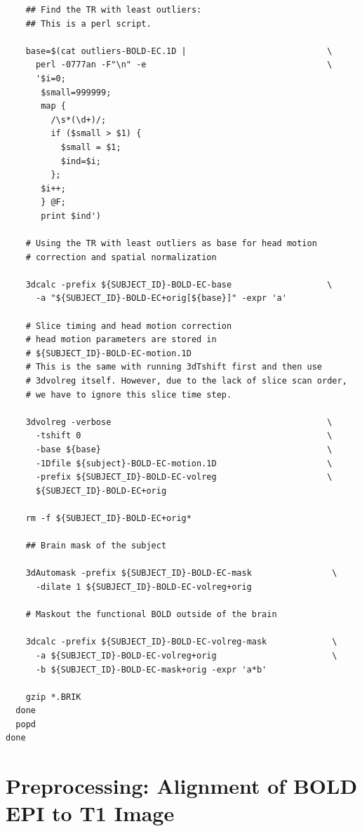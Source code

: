 \documentclass[12pt]{article}
\begin{document}
\begin{verbatim}
    ## Find the TR with least outliers:
    ## This is a perl script.

    base=$(cat outliers-BOLD-EC.1D |                            \
      perl -0777an -F"\n" -e                                    \
      '$i=0;
       $small=999999;
       map {
         /\s*(\d+)/;
         if ($small > $1) {
           $small = $1;
           $ind=$i;
         };
       $i++;
       } @F;
       print $ind')

    # Using the TR with least outliers as base for head motion
    # correction and spatial normalization

    3dcalc -prefix ${SUBJECT_ID}-BOLD-EC-base                   \
      -a "${SUBJECT_ID}-BOLD-EC+orig[${base}]" -expr 'a'

    # Slice timing and head motion correction
    # head motion parameters are stored in
    # ${SUBJECT_ID}-BOLD-EC-motion.1D
    # This is the same with running 3dTshift first and then use
    # 3dvolreg itself. However, due to the lack of slice scan order,
    # we have to ignore this slice time step.

    3dvolreg -verbose                                           \
      -tshift 0                                                 \
      -base ${base}                                             \
      -1Dfile ${subject}-BOLD-EC-motion.1D                      \
      -prefix ${SUBJECT_ID}-BOLD-EC-volreg                      \
      ${SUBJECT_ID}-BOLD-EC+orig

    rm -f ${SUBJECT_ID}-BOLD-EC+orig*

    ## Brain mask of the subject

    3dAutomask -prefix ${SUBJECT_ID}-BOLD-EC-mask                \
      -dilate 1 ${SUBJECT_ID}-BOLD-EC-volreg+orig

    # Maskout the functional BOLD outside of the brain

    3dcalc -prefix ${SUBJECT_ID}-BOLD-EC-volreg-mask             \
      -a ${SUBJECT_ID}-BOLD-EC-volreg+orig                       \
      -b ${SUBJECT_ID}-BOLD-EC-mask+orig -expr 'a*b'

    gzip *.BRIK
  done
  popd
done

\end{verbatim}

\section{Preprocessing: Alignment of BOLD EPI to T1 Image}%
\label{sec:preprocessing_}
\end{document}
